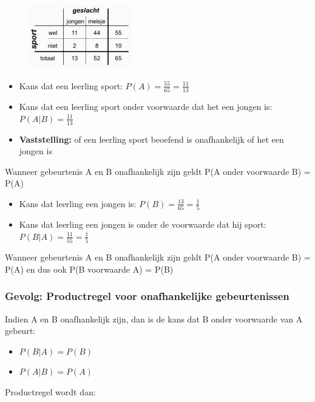 \documentclass{article}
\begin{document}
\begin{figure}[H]
    \centering
    \includegraphics[width=0.4\textwidth]{voorwaardelijke-kans-sport2.png}
\end{figure}

\begin{itemize}
    \item Kans dat een leerling sport: $P(A) = \frac{55}{65} = \frac{11}{13}$
    \item Kans dat een leerling sport onder voorwaarde dat het een jongen is: $P(A | B) = \frac{11}{13}$
    \item \textbf{Vaststelling:} of een leerling sport beoefend is onafhankelijk of het een jongen is
\end{itemize}

Wanneer gebeurtenis A en B onafhankelijk zijn geldt P(A onder voorwaarde B) = P(A)

\begin{itemize}
    \item Kans dat leerling een jongen is: $P(B) = \frac{13}{65}= \frac15$
    \item Kans dat leerling een jongen is onder de voorwaarde dat hij sport: $P(B|A) = \frac{11}{55}= \frac15$
\end{itemize}

Wanneer gebeurtenis A en B onafhankelijk zijn geldt P(A onder voorwaarde B) = P(A) en dus ook P(B voorwaarde A) = P(B)

\subsubsection{Gevolg: Productregel voor onafhankelijke gebeurtenissen}

Indien A en B onafhankelijk zijn, dan is de kans dat B onder voorwaarde van A gebeurt:

\begin{itemize}
    \item $P(B | A) = P(B)$
    \item $P(A | B) = P(A)$
\end{itemize}

Productregel wordt dan: 
\end{document}
